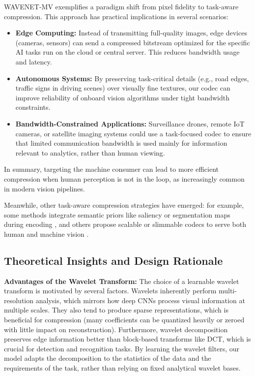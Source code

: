 \documentclass[conference]{IEEEtran}
\begin{document}
WAVENET-MV exemplifies a paradigm shift from pixel fidelity to task-aware compression. This approach has practical implications in several scenarios:
\begin{itemize}
\item \textbf{Edge Computing:} Instead of transmitting full-quality images, edge devices (cameras, sensors) can send a compressed bitstream optimized for the specific AI tasks run on the cloud or central server. This reduces bandwidth usage and latency.
\item \textbf{Autonomous Systems:} By preserving task-critical details (e.g., road edges, traffic signs in driving scenes) over visually fine textures, our codec can improve reliability of onboard vision algorithms under tight bandwidth constraints.
\item \textbf{Bandwidth-Constrained Applications:} Surveillance drones, remote IoT cameras, or satellite imaging systems could use a task-focused codec to ensure that limited communication bandwidth is used mainly for information relevant to analytics, rather than human viewing.
\end{itemize}
In summary, targeting the machine consumer can lead to more efficient compression when human perception is not in the loop, as increasingly common in modern vision pipelines.

Meanwhile, other task-aware compression strategies have emerged: for example, some methods integrate semantic priors like saliency or segmentation maps during encoding \cite{peng2024spl, shindo2024icip}, and others propose scalable or slimmable codecs to serve both human and machine vision \cite{cao2023access}. 

\subsection{Theoretical Insights and Design Rationale}

\textbf{Advantages of the Wavelet Transform:} The choice of a learnable wavelet transform is motivated by several factors. Wavelets inherently perform multi-resolution analysis, which mirrors how deep CNNs process visual information at multiple scales. They also tend to produce sparse representations, which is beneficial for compression (many coefficients can be quantized heavily or zeroed with little impact on reconstruction). Furthermore, wavelet decomposition preserves edge information better than block-based transforms like DCT, which is crucial for detection and recognition tasks. By learning the wavelet filters, our model adapts the decomposition to the statistics of the data and the requirements of the task, rather than relying on fixed analytical wavelet bases.
\end{document}
